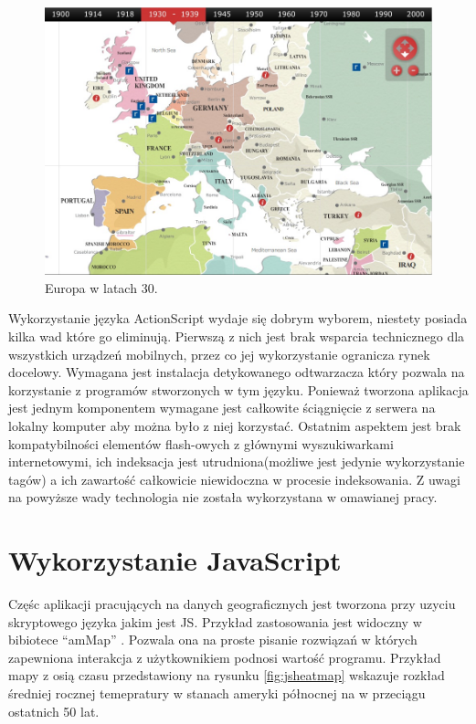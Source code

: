 \begin{figure}[H]
  \centering
    \includegraphics[width=130mm]{ge/archives.jpg}
  \caption{Europa w latach 30.}
  \label{fig:flasheurope}
\end{figure}


Wykorzystanie języka ActionScript wydaje się dobrym wyborem, niestety posiada kilka wad które go eliminują. Pierwszą z nich jest brak wsparcia technicznego dla wszystkich urządzeń mobilnych, przez co jej wykorzystanie ogranicza rynek docelowy.
Wymagana jest instalacja detykowanego odtwarzacza który pozwala na korzystanie z programów stworzonych w tym języku.
Ponieważ tworzona aplikacja jest jednym komponentem wymagane jest całkowite ściągnięcie z serwera na lokalny komputer aby można było z niej korzystać. Ostatnim aspektem jest brak kompatybilności elementów flash-owych z głównymi wyszukiwarkami internetowymi, ich indeksacja jest utrudniona(możliwe jest jedynie wykorzystanie tagów) a ich zawartość całkowicie niewidoczna w procesie indeksowania. Z uwagi na powyższe wady technologia nie została wykorzystana w omawianej pracy.

\section{Wykorzystanie JavaScript}
\label{sec:pref}

Częśc aplikacji pracujących na danych geograficznych jest tworzona przy uzyciu skryptowego języka jakim jest JS. Przykład zastosowania jest widoczny w bibiotece ``amMap'' \cite{jsmapapp}. Pozwala ona na proste pisanie rozwiązań w których zapewniona interakcja z użytkownikiem podnosi wartość programu. Przykład mapy z osią czasu przedstawiony na rysunku \ref{fig:jsheatmap} wskazuje rozkład średniej rocznej temepratury w stanach ameryki północnej na w przeciągu ostatnich 50 lat.

